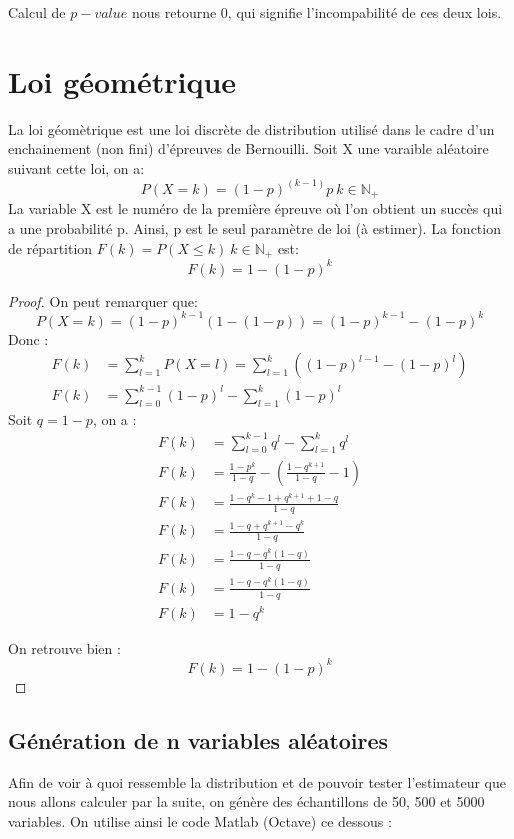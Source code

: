 \documentclass[12pt,a4paper,titlepage]{article}
\numberwithin{equation}{section}
\begin{document}
Calcul de $p-value$ nous retourne $0$, qui signifie l'incompabilité de ces deux lois.
\clearpage

\section{Loi géométrique}

La loi géomètrique est une loi discrète de distribution utilisé
dans le cadre d'un enchainement (non fini) d'épreuves de Bernouilli. Soit
X une varaible aléatoire suivant cette loi, on a:
\[P(X=k) = (1-p)^(k-1)p\ k\in\mathbb{N}_{+}\]
La variable X est le numéro de la première épreuve où l'on obtient un succès
qui a une probabilité p. Ainsi, p est le seul paramètre de loi (à estimer).
La fonction de répartition $F(k) = P(X\leq{}k)\ k\in\mathbb{N}_{+}$ est:
\[F(k)=1-(1-p)^{k}\]
\begin{proof}
On peut remarquer que:
\[P(X=k)=(1-p)^{k-1}(1-(1-p))=(1-p)^{k-1}-(1-p)^{k}\]
Donc :
\begin{align*}
F(k) & =\sum\limits_{l=1}^{k}P(X=l)=\sum\limits_{l=1}^{k}((1-p)^{l-1}-(1-p)^{l}) \\
F(k) & =\sum\limits_{l=0}^{k-1}(1-p)^{l}-\sum\limits_{l=1}^{k}(1-p)^{l}
\end{align*}
Soit $q=1-p$, on a :
\begin{align*}
F(k) & =\sum\limits_{l=0}^{k-1}q^{l}-\sum\limits_{l=1}^{k}q^{l}\\
F(k) & =\frac{1-p^k}{1-q}-(\frac{1-q^{k+1}}{1-q}-1) \\ 
F(k) & =\frac{1-q^k-1+q^{k+1}+1-q}{1-q} \\
F(k) & =\frac{1-q+q^{k+1}-q^k}{1-q} \\
F(k) & =\frac{1-q-q^k(1-q)}{1-q} \\ 
F(k) & =\frac{1-q-q^k(1-q)}{1-q} \\
F(k) & =1-q^k
\end{align*}

On retrouve bien :
\[F(k)=1-(1-p)^k\]
\end{proof}

\subsection{Génération de n variables aléatoires}

Afin de voir à quoi ressemble la distribution et de pouvoir tester l'estimateur que
nous allons calculer par la suite, on génère des échantillons de 50, 500 et 5000 variables.
On utilise ainsi le code Matlab (Octave) ce dessous :
\end{document}
